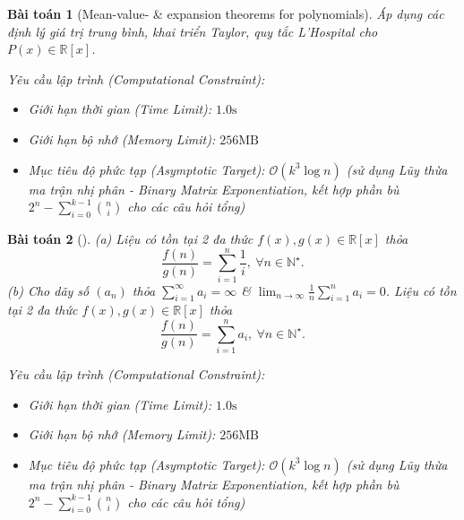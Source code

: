 \documentclass{article}
\newtheorem{baitoan}{Bài toán}
\begin{document}
\begin{baitoan}[Mean-value- \& expansion theorems for polynomials]
	Áp dụng các định lý giá trị trung bình, khai triển Taylor, quy tắc L'Hospital cho $P(x)\in\mathbb{R}[x]$.

    \vspace{0.5em}
    \emph{Yêu cầu lập trình (Computational Constraint):}
    \begin{itemize}
        \item Giới hạn thời gian (Time Limit): $1.0\mathrm{s}$
        \item Giới hạn bộ nhớ (Memory Limit): $256\mathrm{MB}$
        \item Mục tiêu độ phức tạp (Asymptotic Target): $\mathcal{O}(k^3 \log n)$ (sử dụng Lũy thừa ma trận nhị phân - Binary Matrix Exponentiation, kết hợp phần bù $2^n - \sum_{i=0}^{k-1} \binom{n}{i}$ cho các câu hỏi tổng)
    \end{itemize}
\end{baitoan}


\begin{baitoan}[\cite{Quoc_Long_Dat_Nam_VMC}]
	(a) Liệu có tồn tại 2 đa thức $f(x),g(x)\in\mathbb{R}[x]$ thỏa
	\begin{equation*}
		\frac{f(n)}{g(n)} = \sum_{i=1}^n \frac{1}{i},\ \forall n\in\mathbb{N}^\star.
	\end{equation*}
	(b) Cho dãy số $(a_n)$ thỏa $\sum_{i=1}^\infty a_i = \infty$ \& $\lim_{n\to\infty} \frac{1}{n}\sum_{i=1}^n a_i = 0$. Liệu có tồn tại 2 đa thức $f(x),g(x)\in\mathbb{R}[x]$ thỏa
	\begin{equation*}
		\frac{f(n)}{g(n)} = \sum_{i=1}^n a_i,\ \forall n\in\mathbb{N}^\star.
	\end{equation*}

    \vspace{0.5em}
    \emph{Yêu cầu lập trình (Computational Constraint):}
    \begin{itemize}
        \item Giới hạn thời gian (Time Limit): $1.0\mathrm{s}$
        \item Giới hạn bộ nhớ (Memory Limit): $256\mathrm{MB}$
        \item Mục tiêu độ phức tạp (Asymptotic Target): $\mathcal{O}(k^3 \log n)$ (sử dụng Lũy thừa ma trận nhị phân - Binary Matrix Exponentiation, kết hợp phần bù $2^n - \sum_{i=0}^{k-1} \binom{n}{i}$ cho các câu hỏi tổng)
    \end{itemize}
\end{baitoan}
\end{document}
